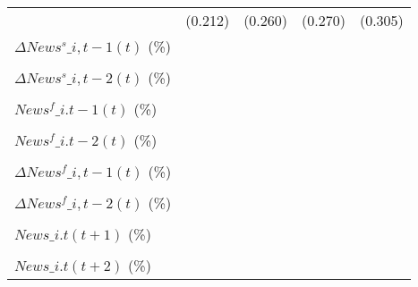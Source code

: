 {\begin{tabular}{l*{4}{c}}
                    &     (0.212)         &     (0.260)         &     (0.270)         &     (0.305)         \\
\addlinespace
$ \Delta News^s\_{i,t-1}(t)$ (\%)&                     &                     &                     &                     \\
                    &                     &                     &                     &                     \\
\addlinespace
$ \Delta News^s\_{i,t-2}(t)$ (\%)&                     &                     &                     &                     \\
                    &                     &                     &                     &                     \\
\addlinespace
$ News^f\_{i.t-1}(t)$ (\%)&                     &                     &                     &                     \\
                    &                     &                     &                     &                     \\
\addlinespace
$ News^f\_{i.t-2}(t)$ (\%)&                     &                     &                     &                     \\
                    &                     &                     &                     &                     \\
\addlinespace
$ \Delta News^f\_{i,t-1}(t)$ (\%)&                     &                     &                     &                     \\
                    &                     &                     &                     &                     \\
\addlinespace
$ \Delta News^f\_{i,t-2}(t)$ (\%)&                     &                     &                     &                     \\
                    &                     &                     &                     &                     \\
\addlinespace
$ News\_{i.t}(t+1)$ (\%)&                     &                     &                     &                     \\
                    &                     &                     &                     &                     \\
\addlinespace
$ News\_{i.t}(t+2)$ (\%)&                     &                     &                     &                     \\

\end{tabular}}
